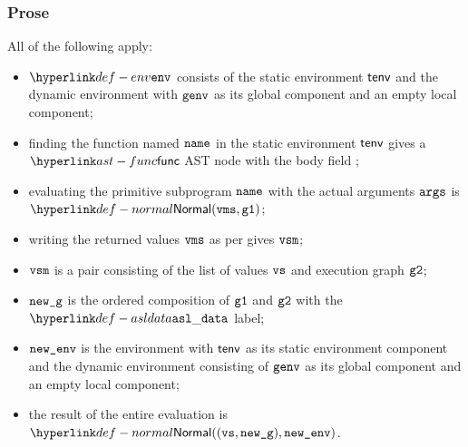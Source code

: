 \begin{mathpar}
\end{mathpar}

\subsubsection{Prose}
All of the following apply:
\begin{itemize}
  \item $\env$ consists of the static environment $\tenv$ and the dynamic environment with $\genv$ as its
        global component and an empty local component;
  \item finding the function named $\name$ in the static environment $\tenv$ gives a $\func$ AST node
        with the body field \SBPrimitive;
  \item evaluating the primitive subprogram $\name$ with the actual arguments $\args$
        is $\Normal(\vms, \vgone)$\ProseOrError;
  \item writing the returned values $\vms$ as per  gives $\vvsm$;
  \item $\vvsm$ is a pair consisting of the list of values $\vvs$ and execution graph $\vgtwo$;
  \item $\newg$ is the ordered composition of $\vgone$ and $\vgtwo$ with the $\asldata$ label;
  \item $\newenv$ is the environment with $\tenv$ as its static environment component
        and the dynamic environment consisting of $\genv$ as its global component and an empty local component;
  \item the result of the entire evaluation is $\Normal((\vvs, \newg), \newenv)$.
\end{itemize}

